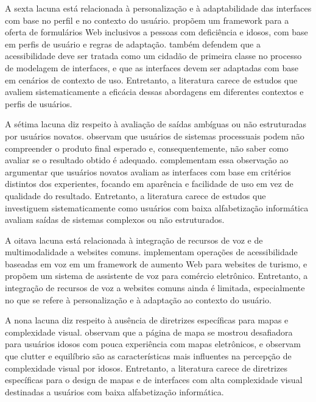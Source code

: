A sexta lacuna está relacionada à personalização e à adaptabilidade das interfaces com base no perfil e no contexto do usuário. \cite{halbach2009framework} propõem um framework para a oferta de formulários Web inclusivos a pessoas com deficiência e idosos, com base em perfis de usuário e regras de adaptação. \cite{wickramathilaka2023addressing} também defendem que a acessibilidade deve ser tratada como um cidadão de primeira classe no processo de modelagem de interfaces, e que as interfaces devem ser adaptadas com base em cenários de contexto de uso. Entretanto, a literatura carece de estudos que avaliem sistematicamente a eficácia dessas abordagens em diferentes contextos e perfis de usuários.

A sétima lacuna diz respeito à avaliação de saídas ambíguas ou não estruturadas por usuários novatos. \cite{mastarone2007access} observam que usuários de sistemas processuais podem não compreender o produto final esperado e, consequentemente, não saber como avaliar se o resultado obtido é adequado. \cite{nosseir2011novice} complementam essa observação ao argumentar que usuários novatos avaliam as interfaces com base em critérios distintos dos experientes, focando em aparência e facilidade de uso em vez de qualidade do resultado. Entretanto, a literatura carece de estudos que investiguem sistematicamente como usuários com baixa alfabetização informática avaliam saídas de sistemas complexos ou não estruturados.

A oitava lacuna está relacionada à integração de recursos de voz e de multimodalidade a websites comuns. \cite{gonzalez2025augmenting} implementam operações de acessibilidade baseadas em voz em um framework de aumento Web para websites de turismo, e \cite{ramineni2024enhancing} propõem um sistema de assistente de voz para comércio eletrônico. Entretanto, a integração de recursos de voz a websites comuns ainda é limitada, especialmente no que se refere à personalização e à adaptação ao contexto do usuário.

A nona lacuna diz respeito à ausência de diretrizes específicas para mapas e complexidade visual. \cite{xie2010usability} observam que a página de mapa se mostrou desafiadora para usuários idosos com pouca experiência com mapas eletrônicos, e \cite{sadeghi2020hci} observam que clutter e equilíbrio são as características mais influentes na percepção de complexidade visual por idosos. Entretanto, a literatura carece de diretrizes específicas para o design de mapas e de interfaces com alta complexidade visual destinadas a usuários com baixa alfabetização informática.

